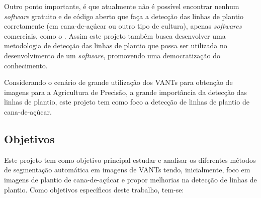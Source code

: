 \documentclass[12pt, a4paper, english, brazil]{article}
\begin{document}
Outro ponto importante, é que atualmente não é possível encontrar nenhum \textit{software} gratuito e de código aberto que faça a detecção das linhas de plantio corretamente (em cana-de-açúcar ou outro tipo de cultura), apenas \textit{softwares} comerciais, como o . Assim este projeto também busca desenvolver uma metodologia de detecção das linhas de plantio que possa ser utilizada no desenvolvimento de um \textit{software}, promovendo uma democratização do conhecimento.

Considerando o cenário de grande utilização dos VANTs para obtenção de imagens para a Agricultura de Precisão, a grande importância da detecção das linhas de plantio, este projeto tem como foco a detecção de linhas de plantio de cana-de-açúcar.

 
\subsection{Objetivos}


Este projeto tem como objetivo principal estudar e analisar os diferentes métodos de segmentação automática em imagens de VANTs tendo, inicialmente, foco em imagens de plantio de cana-de-açúcar e propor melhorias na detecção de linhas de plantio. Como objetivos específicos deste trabalho, tem-se:
\end{document}
